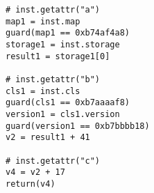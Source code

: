 \begin{Verbatim}
# inst.getattr("a")
map1 = inst.map
guard(map1 == 0xb74af4a8)
storage1 = inst.storage
result1 = storage1[0]

# inst.getattr("b")
cls1 = inst.cls
guard(cls1 == 0xb7aaaaf8)
version1 = cls1.version
guard(version1 == 0xb7bbbb18)
v2 = result1 + 41

# inst.getattr("c")
v4 = v2 + 17
return(v4)
\end{Verbatim}
